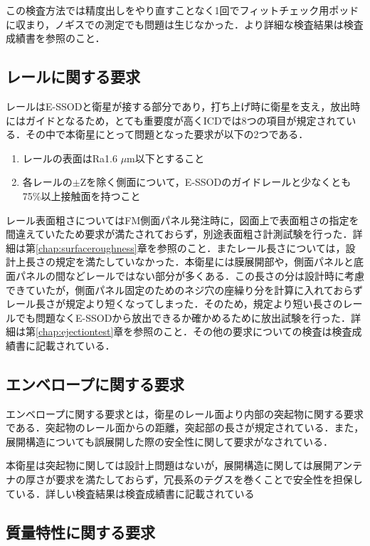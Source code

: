 この検査方法では精度出しをやり直すことなく1回でフィットチェック用ポッドに収まり，ノギスでの測定でも問題は生じなかった．より詳細な検査結果は検査成績書を参照のこと．

\subsection{レールに関する要求}

レールはE-SSODと衛星が接する部分であり，打ち上げ時に衛星を支え，放出時にはガイドとなるため，とても重要度が高くICDでは8つの項目が規定されている．その中で本衛星にとって問題となった要求が以下の2つである．

\begin{enumerate}
	\item レールの表面はRa1.6 $\mu$m以下とすること
	\item 各レールの$\pm$Zを除く側面について，E-SSODのガイドレールと少なくとも75\%以上接触面を持つこと
\end{enumerate}

レール表面粗さについてはFM側面パネル発注時に，図面上で表面粗さの指定を間違えていたため要求が満たされておらず，別途表面粗さ計測試験を行った．詳細は第\ref{chap:surfaceroughness}章を参照のこと．またレール長さについては，設計上長さの規定を満たしていなかった．本衛星には膜展開部や，側面パネルと底面パネルの間などレールではない部分が多くある．この長さの分は設計時に考慮できていたが，側面パネル固定のためのネジ穴の座繰り分を計算に入れておらずレール長さが規定より短くなってしまった．そのため，規定より短い長さのレールでも問題なくE-SSODから放出できるか確かめるために放出試験を行った．詳細は第\ref{chap:ejectiontest}章を参照のこと．その他の要求についての検査は検査成績書に記載されている．

\subsection{エンベロープに関する要求}

エンベロープに関する要求とは，衛星のレール面より内部の突起物に関する要求である．突起物のレール面からの距離，突起部の長さが規定されている．また，展開構造についても誤展開した際の安全性に関して要求がなされている．

本衛星は突起物に関しては設計上問題はないが，展開構造に関しては展開アンテナの厚さが要求を満たしておらず，冗長系のテグスを巻くことで安全性を担保している．詳しい検査結果は検査成績書に記載されている

\subsection{質量特性に関する要求}

